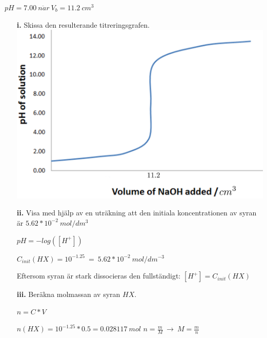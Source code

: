 \documentclass[12pt, letterpaper, twoside]{article}
\begin{document}
\begin{flushleft}
\begin{itemize}
\begin{addmargin}[1em]{2em}
    $ pH = 7.00\ n\ddot{a}r\ V_b = 11.2\ cm^3 $

\end{addmargin}
\hfill
\begin{itemize}
\item[\textbf{i.}] Skissa den resulterande titreringsgrafen.
\includegraphics[scale=0.07]{ph_curve}
\hfill
\item[\textbf{ii.}] Visa med hjälp av en uträkning att den initiala koncentrationen av syran är $ 5.62*10^{-2}\ mol/dm^3 $

$ pH=-log([H^+]) $

$ C_{init}(HX)=10^{-1.25}\ =\ 5.62*10^{-2}\ mol/dm^{-3} $

Eftersom syran är stark dissocieras den fullständigt: $ [H^+] = C_{init}(HX) $


\item[\textbf{iii.}] Beräkna molmassan av syran $ HX $.

$ n=C*V $

$ n(HX)=10^{-1.25}*0.5 = 0.028117\ mol $
\newline
\newline
$ n=\frac{m}{M}\ \rightarrow\ M=\frac{m}{n} $


\end{itemize}
\end{itemize}
\end{flushleft}
\end{document}
